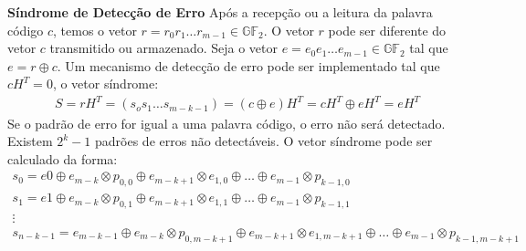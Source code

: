\begin{definition} {\bf Síndrome de Detecção de Erro} \label{sindrome}  Após a recepção ou a leitura da palavra código $c$, temos o vetor $r=r_0r_1 \ldots r_{m-1} \in  \mathbb{GF}_2$. O vetor $r$ pode ser diferente do vetor $c$ transmitido ou armazenado. Seja o vetor $e=e_0e_1 \ldots e_{m-1} \in \mathbb{GF}_2$ tal que $e=r \oplus c$. Um mecanismo de detecção de erro pode ser implementado tal que {\bf $cH^T=0$}, o vetor síndrome:
\begin{align*}
S = rH^T = (s_os_1 \ldots s_{m-k-1}) = (c \oplus e)H^T=cH^T \oplus eH^T = e H^T
\end{align*}
Se o padrão de erro for igual a uma palavra código, o erro não será detectado. Existem $2^k -1$ padrões de erros não detectáveis. O vetor síndrome pode ser calculado da forma:
\begin{align*}
s_0=e0 \oplus e_{m-k} \otimes p_{0,0} \oplus e_{m-k+1} \otimes e_{1,0} \oplus \ldots \oplus  e_{m-1} \otimes p_{k-1,0}\\
s_1=e1 \oplus e_{m-k} \otimes p_{0,1} \oplus e_{m-k+1} \otimes e_{1,1} \oplus \ldots \oplus  e_{m-1} \otimes p_{k-1,1}\\
\vdots\\
s_{n-k-1}=e_{m-k-1} \oplus e_{m-k} \otimes p_{0,m-k+1} \oplus e_{m-k+1} \otimes e_{1,m-k+1} \oplus \ldots \oplus  e_{m-1} \otimes p_{k-1,m-k+1}
\end{align*}
\end{definition}

